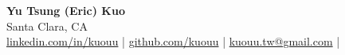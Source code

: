 \begin{center}%
    \textbf{\large{Yu Tsung (Eric) Kuo}} \\
    Santa Clara, CA \\
    \href{https://linkedin.com/in/kuouu}{linkedin.com/in/kuouu} |
    \href{https://github.com/kuouu}{github.com/kuouu} |
    \href{mailto:kuouu.tw@gmail.com}{kuouu.tw@gmail.com} |
\end{center}%
